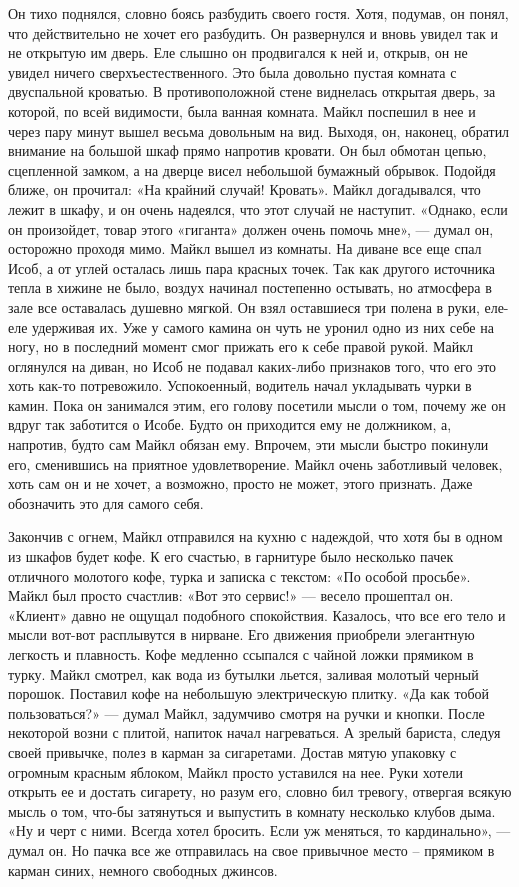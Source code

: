 Он тихо поднялся, словно боясь разбудить своего гостя. Хотя, подумав, он понял, что действительно не хочет его разбудить. Он развернулся и вновь увидел так и не открытую им дверь. Еле слышно он продвигался к ней и, открыв, он не увидел ничего сверхъестественного. Это была довольно пустая комната с двуспальной кроватью. В противоположной стене виднелась открытая дверь, за которой, по всей видимости, была ванная комната. Майкл поспешил в нее и через пару минут вышел весьма довольным на вид. Выходя, он, наконец, обратил внимание на большой шкаф прямо напротив кровати. Он был обмотан цепью, сцепленной замком, а на дверце висел небольшой бумажный обрывок. Подойдя ближе, он прочитал: «На крайний случай! Кровать». Майкл догадывался, что лежит в шкафу, и он очень надеялся, что этот случай не наступит. «Однако, если он произойдет, товар этого «гиганта» должен очень помочь мне», — думал он, осторожно проходя мимо. Майкл вышел из комнаты. На диване все еще спал Исоб, а от углей осталась лишь пара красных точек. Так как другого источника тепла в хижине не было, воздух начинал постепенно остывать, но атмосфера в зале все оставалась душевно мягкой. Он взял оставшиеся три полена в руки, еле-еле удерживая их. Уже у самого камина он чуть не уронил одно из них себе на ногу, но в последний момент смог прижать его к себе правой рукой. Майкл оглянулся на диван, но Исоб не подавал каких-либо признаков того, что его это хоть как-то потревожило. Успокоенный, водитель начал укладывать чурки в камин. Пока он занимался этим, его голову посетили мысли о том, почему же он вдруг так заботится о Исобе. Будто он приходится ему не должником, а, напротив, будто сам Майкл обязан ему. Впрочем, эти мысли быстро покинули его, сменившись на приятное удовлетворение. Майкл очень заботливый человек, хоть сам он и не хочет, а возможно, просто не может, этого признать. Даже обозначить это для самого себя.

Закончив с огнем, Майкл отправился на кухню с надеждой, что хотя бы в одном из шкафов будет кофе. К его счастью, в гарнитуре было несколько пачек отличного молотого кофе, турка и записка с текстом: «По особой просьбе». Майкл был просто счастлив: «Вот это сервис!» — весело прошептал он. «Клиент» давно не ощущал подобного спокойствия. Казалось, что все его тело и мысли вот-вот расплывутся в нирване. Его движения приобрели элегантную легкость и плавность. Кофе медленно ссыпался с чайной ложки прямиком в турку. Майкл смотрел, как вода из бутылки льется, заливая молотый черный порошок. Поставил кофе на небольшую электрическую плитку. «Да как тобой пользоваться?» — думал Майкл, задумчиво смотря на ручки и кнопки. После некоторой возни с плитой, напиток начал нагреваться. А зрелый бариста, следуя своей привычке, полез в карман за сигаретами. Достав мятую упаковку с огромным красным яблоком, Майкл просто уставился на нее. Руки хотели открыть ее и достать сигарету, но разум его, словно бил тревогу, отвергая всякую мысль о том, что-бы затянуться и выпустить в комнату несколько клубов дыма. «Ну и черт с ними. Всегда хотел бросить. Если уж меняться, то кардинально», — думал он. Но пачка все же отправилась на свое привычное место – прямиком в карман синих, немного свободных джинсов.


